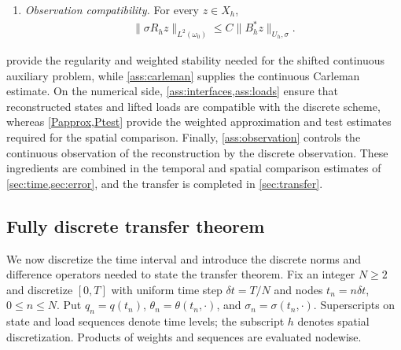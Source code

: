 \documentclass[print,wide,eng]{draft}
\begin{document}
\begin{enumerate}[label=\textbf{(N\arabic*)},ref=(N\arabic*)]
\begin{align}
(z,\mathscr{T}_{\sigma,h}z)_{X_h}&\asymp\|\sigma R_hz\|_{L^2(\Omega)}^2.\label{eq:test-norm}
\end{align}
Its temporal derivative satisfies
\begin{align}
|(z,\mathscr{T}_{\sigma,h}'z)_{X_h}|&\leq C\|q\sigma R_hz\|_{L^2(\Omega)}^2,\label{eq:testtime}
\end{align}
and the spatial superapproximation estimate is
\begin{align}
\mathcal N_{\sigma^{-1},\Omega}(R_h\mathscr{T}_{\sigma,h}z-\sigma^2R_hz)
&\leq Chq_{\max}\mathcal N_{\sigma,\Omega}(R_hz).\label{eq:testsuper}
\end{align}
\item\label{ass:observation} \emph{Observation compatibility.} For every $z\in X_h$,
\begin{align}\label{eq:observationinterface}
\|\sigma R_hz\|_{L^2(\omega_0)}\leq C\|B_h^*z\|_{U_h,\sigma}.
\end{align}
\end{enumerate}

 provide the regularity and weighted stability needed for the shifted continuous auxiliary problem, while \cref{ass:carleman} supplies the continuous Carleman estimate. On the numerical side, \cref{ass:interfaces,ass:loads} ensure that reconstructed states and lifted loads are compatible with the discrete scheme, whereas \cref{Papprox,Ptest} provide the weighted approximation and test estimates required for the spatial comparison. Finally, \cref{ass:observation} controls the continuous observation of the reconstruction by the discrete observation. These ingredients are combined in the temporal and spatial comparison estimates of \cref{sec:time,sec:error}, and the transfer is completed in \cref{sec:transfer}.


\subsection{Fully discrete transfer theorem}

We now discretize the time interval and introduce the discrete norms and difference operators needed to state the transfer theorem. Fix an integer $N\geq2$ and discretize $[0,T]$ with uniform time step ${\delta t}=T/N$ and nodes $t_n=n{\delta t}$, $0\leq n\leq N$. Put $q_n=q(t_n)$, $\theta_n=\theta(t_n,\cdot)$, and $\sigma_n=\sigma(t_n,\cdot)$. Superscripts on state and load sequences denote time levels; the subscript $h$ denotes spatial discretization. Products of weights and sequences are evaluated nodewise.
\end{document}
